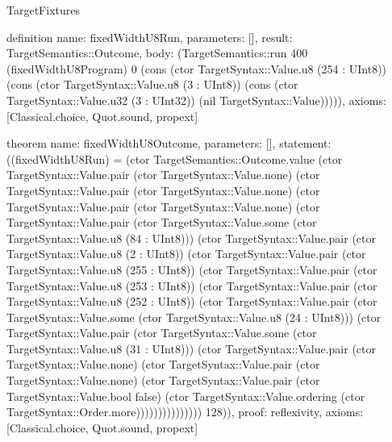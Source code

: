 \begin{lexlean}{TargetFixtures}
\begin{semanticmodule}
definition{
  name: fixedWidthU8Run,
  parameters: [],
  result: TargetSemantics::Outcome,
  body: (TargetSemantics::run 400 (fixedWidthU8Program) 0 (cons (ctor TargetSyntax::Value.u8 (254 : UInt8)) (cons (ctor TargetSyntax::Value.u8 (3 : UInt8)) (cons (ctor TargetSyntax::Value.u32 (3 : UInt32)) (nil TargetSyntax::Value))))),
  axioms: [Classical.choice, Quot.sound, propext]
}

theorem{
  name: fixedWidthU8Outcome,
  parameters: [],
  statement: ((fixedWidthU8Run) = (ctor TargetSemantics::Outcome.value (ctor TargetSyntax::Value.pair (ctor TargetSyntax::Value.none) (ctor TargetSyntax::Value.pair (ctor TargetSyntax::Value.none) (ctor TargetSyntax::Value.pair (ctor TargetSyntax::Value.none) (ctor TargetSyntax::Value.pair (ctor TargetSyntax::Value.some (ctor TargetSyntax::Value.u8 (84 : UInt8))) (ctor TargetSyntax::Value.pair (ctor TargetSyntax::Value.u8 (2 : UInt8)) (ctor TargetSyntax::Value.pair (ctor TargetSyntax::Value.u8 (255 : UInt8)) (ctor TargetSyntax::Value.pair (ctor TargetSyntax::Value.u8 (253 : UInt8)) (ctor TargetSyntax::Value.pair (ctor TargetSyntax::Value.u8 (252 : UInt8)) (ctor TargetSyntax::Value.pair (ctor TargetSyntax::Value.some (ctor TargetSyntax::Value.u8 (24 : UInt8))) (ctor TargetSyntax::Value.pair (ctor TargetSyntax::Value.some (ctor TargetSyntax::Value.u8 (31 : UInt8))) (ctor TargetSyntax::Value.pair (ctor TargetSyntax::Value.none) (ctor TargetSyntax::Value.pair (ctor TargetSyntax::Value.none) (ctor TargetSyntax::Value.pair (ctor TargetSyntax::Value.bool false) (ctor TargetSyntax::Value.ordering (ctor TargetSyntax::Order.more))))))))))))))) 128)),
  proof: reflexivity{},
  axioms: [Classical.choice, Quot.sound, propext]
}


\end{semanticmodule}
\end{lexlean}
